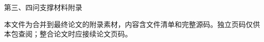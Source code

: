 \documentclass[UTF8,fontset=fandol,a4paper,10pt]{ctexart}
\begin{document}
\begin{center}\Large 第三、四问支撑材料附录\end{center}
本文件为合并到最终论文的附录素材，内容含文件清单和完整源码。独立页码仅供本包查阅；整合论文时应接续论文页码。

\clearpage

\end{document}
